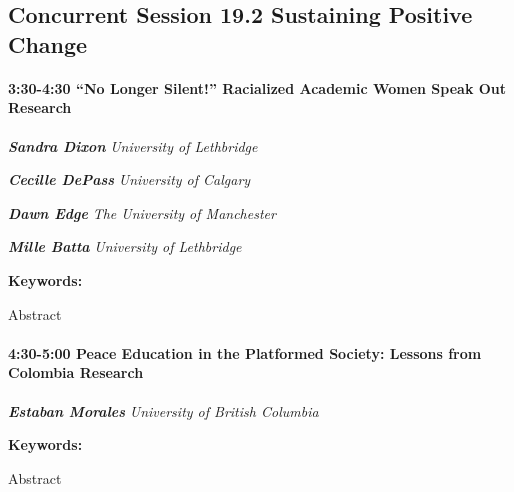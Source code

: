 \documentclass[
]{book}
\begin{document}
\hypertarget{concurrent-session-19.2-sustaining-positive-change}{%
\subsection*{Concurrent Session 19.2 \textbar{} Sustaining Positive Change}\label{concurrent-session-19.2-sustaining-positive-change}}

\begin{session}
\hypertarget{no-longer-silent-racialized-academic-women-speak-out-research}{%
\paragraph*{\texorpdfstring{3:30-4:30 \textbar{} \textbf{``No Longer
Silent!'' Racialized Academic Women Speak Out} \textbar{}
Research}{3:30-4:30 \textbar{} ``No Longer Silent!'' Racialized Academic Women Speak Out \textbar{} Research}}\label{no-longer-silent-racialized-academic-women-speak-out-research}}

\textbf{\emph{Sandra Dixon}} \textbar{} \emph{University of Lethbridge}

\textbf{\emph{Cecille DePass}} \textbar{} \emph{University of Calgary}

\textbf{\emph{Dawn Edge}} \textbar{} \emph{The University of Manchester}

\textbf{\emph{Mille Batta}} \textbar{} \emph{University of Lethbridge}

\textbf{Keywords:}

Abstract
\end{session}

\begin{session}
\hypertarget{peace-education-in-the-platformed-society-lessons-from-colombia-research}{%
\paragraph*{\texorpdfstring{4:30-5:00 \textbar{} \textbf{Peace Education
in the Platformed Society: Lessons from Colombia} \textbar{}
Research}{4:30-5:00 \textbar{} Peace Education in the Platformed Society: Lessons from Colombia \textbar{} Research}}\label{peace-education-in-the-platformed-society-lessons-from-colombia-research}}

\textbf{\emph{Estaban Morales}} \textbar{} \emph{University of British
Columbia}

\textbf{Keywords:}

Abstract
\end{session}
\end{document}
